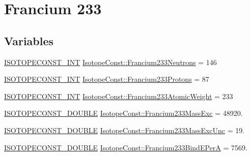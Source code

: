 \hypertarget{group___isotope_const-_francium-_fr233}{}\section{Francium 233}
\label{group___isotope_const-_francium-_fr233}
\subsection*{Variables}
\begin{DoxyCompactItemize}
\item 
\mbox{\hyperlink{group___isotope_const-_macros_ga5f18360b3e99483a35c32d789e62621c}{I\+S\+O\+T\+O\+P\+E\+C\+O\+N\+S\+T\+\_\+\+I\+NT}} \mbox{\hyperlink{group___isotope_const-_francium-_fr233_gaade30af66d1f792d5bd3621e39f527e2}{Isotope\+Const\+::\+Francium233\+Neutrons}} = 146
\item 
\mbox{\hyperlink{group___isotope_const-_macros_ga5f18360b3e99483a35c32d789e62621c}{I\+S\+O\+T\+O\+P\+E\+C\+O\+N\+S\+T\+\_\+\+I\+NT}} \mbox{\hyperlink{group___isotope_const-_francium-_fr233_ga9f34e22f53cf6a61fba37d840c9d4c6c}{Isotope\+Const\+::\+Francium233\+Protons}} = 87
\item 
\mbox{\hyperlink{group___isotope_const-_macros_ga5f18360b3e99483a35c32d789e62621c}{I\+S\+O\+T\+O\+P\+E\+C\+O\+N\+S\+T\+\_\+\+I\+NT}} \mbox{\hyperlink{group___isotope_const-_francium-_fr233_ga7518f655a168dace9368ce067d91918d}{Isotope\+Const\+::\+Francium233\+Atomic\+Weight}} = 233
\item 
\mbox{\hyperlink{group___isotope_const-_macros_ga8f45a7272ce02c0b4c65c44636ed719a}{I\+S\+O\+T\+O\+P\+E\+C\+O\+N\+S\+T\+\_\+\+D\+O\+U\+B\+LE}} \mbox{\hyperlink{group___isotope_const-_francium-_fr233_ga9eff3a319ebbb4fbe3448a80d7d2991b}{Isotope\+Const\+::\+Francium233\+Mass\+Exc}} = 48920.
\item 
\mbox{\hyperlink{group___isotope_const-_macros_ga8f45a7272ce02c0b4c65c44636ed719a}{I\+S\+O\+T\+O\+P\+E\+C\+O\+N\+S\+T\+\_\+\+D\+O\+U\+B\+LE}} \mbox{\hyperlink{group___isotope_const-_francium-_fr233_ga45047c8a0cbf113b1892d80ce7a415e9}{Isotope\+Const\+::\+Francium233\+Mass\+Exc\+Unc}} = 19.
\item 
\mbox{\hyperlink{group___isotope_const-_macros_ga8f45a7272ce02c0b4c65c44636ed719a}{I\+S\+O\+T\+O\+P\+E\+C\+O\+N\+S\+T\+\_\+\+D\+O\+U\+B\+LE}} \mbox{\hyperlink{group___isotope_const-_francium-_fr233_gac5870ffd117aa6aa7d3bbfa8666ce4c4}{Isotope\+Const\+::\+Francium233\+Bind\+E\+PerA}} = 7569.
\item 

\end{DoxyCompactItemize}
